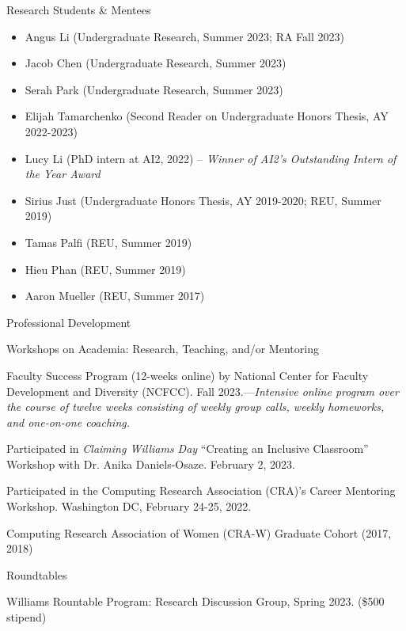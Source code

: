 \documentclass{resume} %
\begin{document}

\begin{rSection}{Research Students \& Mentees}

\begin{itemize}
\item Angus Li (Undergraduate Research, Summer 2023; RA Fall 2023)
\item Jacob Chen (Undergraduate Research, Summer 2023)
\item Serah Park (Undergraduate Research, Summer 2023)
\item Elijah Tamarchenko (Second Reader on Undergraduate Honors Thesis, AY 2022-2023)
\item Lucy Li (PhD intern at AI2, 2022) -- \emph{Winner of AI2's Outstanding Intern of the Year Award}
\item Sirius Just (Undergraduate Honors Thesis, AY 2019-2020; REU, Summer 2019) 
\item Tamas Palfi (REU, Summer 2019) 
\item Hieu Phan (REU, Summer 2019) 
\item Aaron Mueller (REU, Summer 2017) 
\end{itemize}
\end{rSection}

\begin{rSection}{Professional Development}


\begin{rSubsection}{Workshops on Academia: Research, Teaching, and/or Mentoring}{}{}{}
\item Faculty Success Program (12-weeks online) by National Center for Faculty Development and Diversity (NCFCC). Fall 2023.---\emph{Intensive online program over the course of twelve weeks consisting of weekly group calls, weekly homeworks, and one-on-one coaching.}
\item Participated in \emph{Claiming Williams Day} ``Creating an Inclusive Classroom'' Workshop with Dr. Anika Daniels-Osaze. February 2, 2023.
\item Participated in the Computing Research Association (CRA)'s Career Mentoring Workshop. Washington DC, February 24-25, 2022. 
\item Computing Research Association of Women (CRA-W) Graduate Cohort (2017, 2018)  
\end{rSubsection}

\begin{rSubsection}{Roundtables}{}{}{}
\item Williams Rountable Program: Research Discussion Group, Spring 2023. (\$500 stipend)
\end{rSubsection}
\end{rSection}
\end{document}
